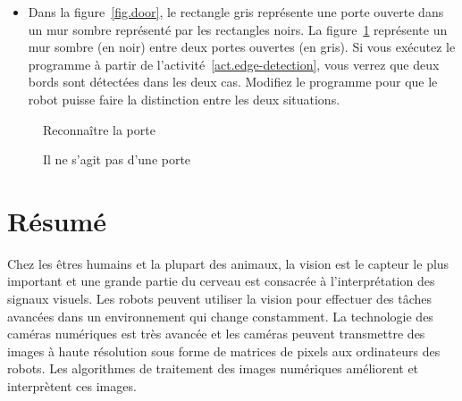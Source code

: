 \begin{framed}
\begin{itemize}
\item Dans la figure~\ref{fig.door}, le rectangle gris représente une porte ouverte dans un mur sombre représenté par les rectangles noirs. La figure~\ref{fig.not-a-door} représente un mur sombre (en noir) entre deux portes ouvertes (en gris). Si vous exécutez le programme à partir de l'activité~\ref{act.edge-detection}, vous verrez que deux bords sont détectées dans les deux cas. Modifiez le programme pour que le robot puisse faire la distinction entre les deux situations.
\end{itemize}
\end{framed}

\begin{figure}
\begin{minipage}{.45\textwidth}
\caption{Reconnaître la porte}\label{fig.door}
\end{minipage}
\hspace{\fill}
\begin{minipage}{.45\textwidth}
\caption{Il ne s'agit pas d'une porte}\label{fig.not-a-door}
\end{minipage}
\end{figure}

\section{Résumé}

Chez les êtres humains et la plupart des animaux, la vision est le capteur le plus important et une grande partie du cerveau est consacrée à l'interprétation des signaux visuels. Les robots peuvent utiliser la vision pour effectuer des tâches avancées dans un environnement qui change constamment. La technologie des caméras numériques est très avancée et les caméras peuvent transmettre des images à haute résolution sous forme de matrices de pixels aux ordinateurs des robots. Les algorithmes de traitement des images numériques améliorent et interprètent ces images.

